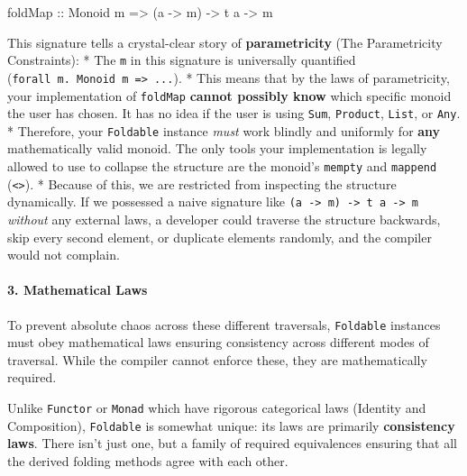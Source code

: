 \documentclass[
]{article}
\newenvironment{Shaded}{}{}
\newcommand{\DataTypeTok}[1]{\textcolor[rgb]{0.56,0.13,0.00}{#1}}
\newcommand{\FunctionTok}[1]{\textcolor[rgb]{0.02,0.16,0.49}{#1}}
\newcommand{\NormalTok}[1]{#1}
\newcommand{\OtherTok}[1]{\textcolor[rgb]{0.00,0.44,0.13}{#1}}
\begin{document}
\begin{Shaded}
\begin{Highlighting}[]
\FunctionTok{foldMap}\OtherTok{ ::} \DataTypeTok{Monoid}\NormalTok{ m }\OtherTok{=\textgreater{}}\NormalTok{ (a }\OtherTok{{-}\textgreater{}}\NormalTok{ m) }\OtherTok{{-}\textgreater{}}\NormalTok{ t a }\OtherTok{{-}\textgreater{}}\NormalTok{ m}
\end{Highlighting}
\end{Shaded}

This signature tells a crystal-clear story of \textbf{parametricity}
(The Parametricity Constraints): * The \texttt{m} in this signature is
universally quantified
(\texttt{forall\ m.\ Monoid\ m\ =\textgreater{}\ ...}). * This means
that by the laws of parametricity, your implementation of
\texttt{foldMap} \textbf{cannot possibly know} which specific monoid the
user has chosen. It has no idea if the user is using \texttt{Sum},
\texttt{Product}, \texttt{List}, or \texttt{Any}. * Therefore, your
\texttt{Foldable} instance \emph{must} work blindly and uniformly for
\textbf{any} mathematically valid monoid. The only tools your
implementation is legally allowed to use to collapse the structure are
the monoid's \texttt{mempty} and \texttt{mappend}
(\texttt{\textless{}\textgreater{}}). * Because of this, we are
restricted from inspecting the structure dynamically. If we possessed a
naive signature like
\texttt{(a\ -\textgreater{}\ m)\ -\textgreater{}\ t\ a\ -\textgreater{}\ m}
\emph{without} any external laws, a developer could traverse the
structure backwards, skip every second element, or duplicate elements
randomly, and the compiler would not complain.

\paragraph{3. Mathematical Laws}\label{mathematical-laws-1}

To prevent absolute chaos across these different traversals,
\texttt{Foldable} instances must obey mathematical laws ensuring
consistency across different modes of traversal. While the compiler
cannot enforce these, they are mathematically required.

Unlike \texttt{Functor} or \texttt{Monad} which have rigorous
categorical laws (Identity and Composition), \texttt{Foldable} is
somewhat unique: its laws are primarily \textbf{consistency laws}. There
isn't just one, but a family of required equivalences ensuring that all
the derived folding methods agree with each other.
\end{document}
